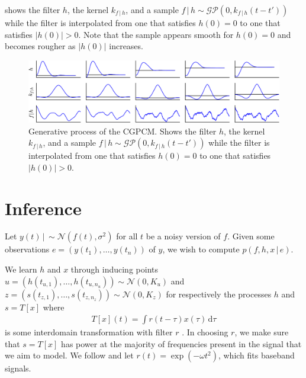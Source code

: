 \documentclass{article}
\newcommand{\id}[1]{\, \mathrm{d} #1}     %
\newcommand{\cond}{\, | \,}               %
\begin{document}
 shows the filter $h$, the kernel $k_{f\cond h}$, and a sample $f\cond h \sim \mathcal{GP}(0,k_{f\cond h}(t-t'))$ while the filter is interpolated from one that satisfies $h(0)=0$ to one that satisfies $|h(0)|>0$. Note that the sample appears smooth for $h(0)=0$ and becomes rougher as $|h(0)|$ increases.

\begin{figure}[t]
    \vskip 0.1in
    \centering
    \includegraphics[width=\linewidth]{resources/cropped/interpolation.pdf}
    \caption{Generative process of the CGPCM. Shows the filter $h$, the kernel $k_{f\cond h}$, and a sample $f\cond h \sim \mathcal{GP}(0,k_{f\cond h}(t-t'))$ while the filter is interpolated from one that satisfies $h(0)=0$ to one that satisfies $|h(0)|>0$.}
    \label{fig:interpolation}
\end{figure}


\section{Inference}
\label{sec:inference}
Let $y(t)\cond \sim \mathcal{N}(f(t),\sigma^2)$ for all $t$ be a noisy version of $f$. Given some observations $e=(y(t_1),\ldots,y(t_n))$ of $y$, we wish to compute $p(f,h,x\cond e)$.

We learn $h$ and $x$ through inducing points \cite{Titsias:2009:Variational_Learning} $u=(h(t_{u,1}),\ldots,h(t_{u,n_u}))\sim \mathcal{N}(0,K_u)$ and $z=(s(t_{z,1}),\ldots,s(t_{z,n_z}))\sim \mathcal{N}(0,K_z)$ for respectively the processes $h$ and $s=T[x]$ where
\begin{align*}
    T[x](t)=\int r(t- \tau)x(\tau) \id{\tau}
\end{align*}
is some interdomain transformation with filter $r$ \cite{Lazaro-Gredilla:2009:Inter-Domain_Gaussian_Processes_for_Sparse,Alvarez:2010:Efficient_Multioutput_Gaussian_Processes_Through,Tobar:2015:Learning_Stationary}. In choosing $r$, we make sure that $s=T[x]$ has power at the majority of frequencies present in the signal that we aim to model. We follow \citet{Tobar:2015:Learning_Stationary} and let $r(t)=\exp(-\omega t^2)$, which fits baseband signals.
\end{document}
